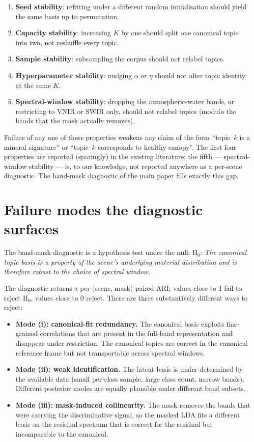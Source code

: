 \documentclass[11pt,a4paper]{article}
\begin{document}
\begin{enumerate}
\item \textbf{Seed stability}: refitting under a different random
initialisation should yield the same basis up to permutation.
\item \textbf{Capacity stability}: increasing $K$ by one should split
one canonical topic into two, not reshuffle every topic.
\item \textbf{Sample stability}: subsampling the corpus should not
relabel topics.
\item \textbf{Hyperparameter stability}: nudging $\alpha$ or $\eta$
should not alter topic identity at the same $K$.
\item \textbf{Spectral-window stability}: dropping the
atmospheric-water bands, or restricting to VNIR or SWIR only, should
not relabel topics (modulo the bands that the mask actually removes).
\end{enumerate}

Failure of any one of these properties weakens any claim of the form
``topic~$k$ is a mineral signature'' or ``topic~$k$ corresponds to
healthy canopy''. The first four properties are reported (sparingly)
in the existing literature; the fifth --- spectral-window stability
--- is, to our knowledge, not reported anywhere as a per-scene
diagnostic. The band-mask diagnostic of the main paper fills exactly
this gap.

\section{Failure modes the diagnostic surfaces}

The band-mask diagnostic is a hypothesis test under the null:
\textsc{H$_0$}: \emph{The canonical topic basis is a property of the
scene's underlying material distribution and is therefore robust to
the choice of spectral window.}

The diagnostic returns a per-(scene, mask) paired ARI; values close
to 1 fail to reject \textsc{H$_0$}, values close to 0 reject. There
are three substantively different ways to reject:

\begin{itemize}
\item \textbf{Mode (i): canonical-fit redundancy.} The canonical
basis exploits fine-grained correlations that are present in the
full-band representation and disappear under restriction. The
canonical topics are correct in the canonical reference frame but
not transportable across spectral windows.
\item \textbf{Mode (ii): weak identification.} The latent basis is
under-determined by the available data (small per-class sample, large
class count, narrow bands). Different posterior modes are equally
plausible under different band subsets.
\item \textbf{Mode (iii): mask-induced collinearity.} The mask
removes the bands that were carrying the discriminative signal, so
the masked LDA fits a different basis on the residual spectrum that
is correct for the residual but incomparable to the canonical.
\end{itemize}
\end{document}
